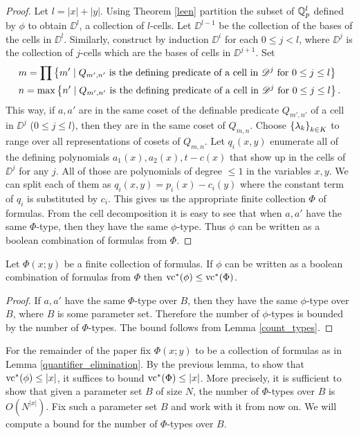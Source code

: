 \documentclass{amsart}
\begin{document}
\begin{proof}
  Let $l = |x| + |y|$.
  Using Theorem \ref{leen} partition the subset of $\mathbb{Q}_p^l$ defined by $\phi$ to obtain $\DD^l$, a collection of $l$-cells.
  Let $\DD^{l-1}$ be the collection of the bases of the cells in $\DD^l$.
  Similarly, construct by induction $\DD^i$ for each $0 \leq j < l$,
  where $\DD^j$ is the collection of $j$-cells which are the bases of cells in $\DD^{j+1}$.
  Set
  \begin{align*}
    &m = \prod \left\{m' \mid Q_{m',n'} \text{ is the defining predicate of a cell in $\mathscr D^j$ for $0 \leq j \leq l$} \right\} \\
    &n = \max \left\{n' \mid Q_{m',n'} \text{ is the defining predicate of a cell in $\mathscr D^j$ for $0 \leq j \leq l$} \right\}.
  \end{align*}
  This way, if $a, a'$ are in the same coset of the definable predicate
  $Q_{m',n'}$ of a cell in $\DD^j$ ($0 \leq j \leq l$),
  then they are in the same coset of $Q_{m,n}$.
  Choose $\left\{\lambda_k\right\}_{k \in K}$ to range over all representations of cosets of $Q_{m,n}$.
  Let $q_i(x, y)$ enumerate all of the defining polynomials $a_1(x), a_2(x), t - c(x)$ that show up in the cells of $\DD^j$ for any $j$.
  All of those are polynomials of degree $\leq 1$ in the variables $x, y$.
  We can split each of them as $q_i(x,y) = p_i(x) - c_i(y)$ where the constant term of $q_i$ is substituted by $c_i$.
  This gives us the appropriate finite collection $\Phi$ of formulas.
  From the cell decomposition it is easy to see that when $a, a'$ have the same $\Phi$-type,
  then they have the same $\phi$-type.
  Thus $\phi$ can be written as a boolean combination of formulas from $\Phi$.
\end{proof}

\begin{Lemma}
  Let $\Phi(x; y)$ be a finite collection of formulas.
  If $\phi$ can be written as a boolean combination of formulas from $\Phi$ then $\operatorname{vc}^* (\phi) \leq \operatorname{vc}^* (\Phi)$.
\end{Lemma}
\begin{proof}
  If $a,a'$ have the same $\Phi$-type over $B$, then they have the same $\phi$-type over $B$, where $B$ is some parameter set.
  Therefore the number of $\phi$-types is bounded by the number of $\Phi$-types.
  The bound follows from Lemma \ref{count_types}.
\end{proof}

For the remainder of the paper fix $\Phi(x; y)$ to be a collection of formulas as in Lemma \ref{quantifier_elimination}.
By the previous lemma, to show that $\operatorname{vc}^*(\phi) \leq |x|$, it suffices to bound $\operatorname{vc}^*(\Phi) \leq |x|$.
More precisely, it is sufficient to show that given a parameter set $B$ of size $N$,
the number of $\Phi$-types over $B$ is $O(N^{|x|})$.
Fix such a parameter set $B$ and work with it from now on.
We will compute a bound for the number of $\Phi$-types over $B$.
\end{document}
